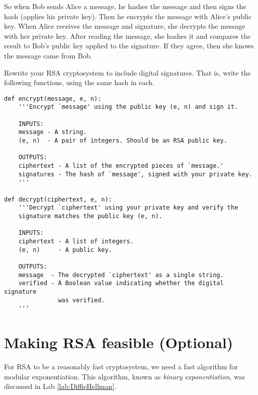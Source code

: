 So when Bob sends Alice a message, he hashes the message and then signs the hash (applies his private key).
Then he encrypts the message with Alice's public key. 
When Alice receives the message and signature, she decrypts the message with her private key.
After reading the message, she hashes it and compares the result to Bob's public key applied to the signature.
If they agree, then she knows the message came from Bob.

\begin{problem}
Rewrite your RSA cryptosystem to include digital signatures. 
That is, write the following functions, using the same hash in each.
\begin{lstlisting}
def encrypt(message, e, n):
    '''Encrypt `message' using the public key (e, n) and sign it.
    
    INPUTS:
    message - A string.
    (e, n)  - A pair of integers. Should be an RSA public key.
    
    OUTPUTS:
    ciphertext - A list of the encrypted pieces of `message.'
    signatures - The hash of `message', signed with your private key.
    '''
    
def decrypt(ciphertext, e, n):
    '''Decrypt `ciphertext' using your private key and verify the 
    signature matches the public key (e, n).
    
    INPUTS:
    ciphertext - A list of integers.
    (e, n)     - A public key.
    
    OUTPUTS:
    message  - The decrypted `ciphertext' as a single string.
    verified - A Boolean value indicating whether the digital signature 
               was verified.
    '''
\end{lstlisting}
\end{problem}




















\section*{Making RSA feasible (Optional)}

For RSA to be a reasonably fast cryptosystem, we need a fast algorithm for modular exponentiation.
This algorithm, known as \emph{binary exponentiation}, was discussed in Lab \ref{lab:DiffieHellman}.

